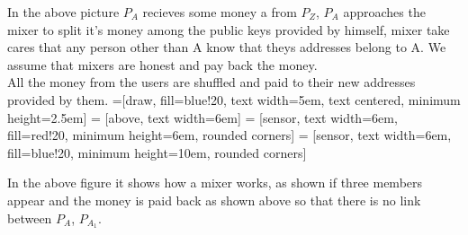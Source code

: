 \documentclass{article}
\begin{document}
In the above picture $P_A$ recieves some money a from $P_Z$, $P_A$ approaches the mixer to split it's money among the public keys provided by himself, mixer take cares that any person other than A know that theys addresses belong to A. We assume that mixers are honest and pay back the money.\\
All the money from the users are shuffled and paid to their new addresses provided by them.
=[draw, fill=blue!20, text width=5em, 
text centered, minimum height=2.5em]
 = [above, text width=6em]
 = [sensor, text width=6em, fill=red!20, 
minimum height=6em, rounded corners]
 = [sensor, text width=6em, fill=blue!20, 
minimum height=10em, rounded corners]
\def\blockdist{2.3}
\def\edgedist{1}
\begin{center}
\end{center}
In the above figure it shows how a mixer works, as shown if three members appear and the money is paid back as shown above so that there is no link between $P_A$, $P_{A_{1}}$.
\end{document}
